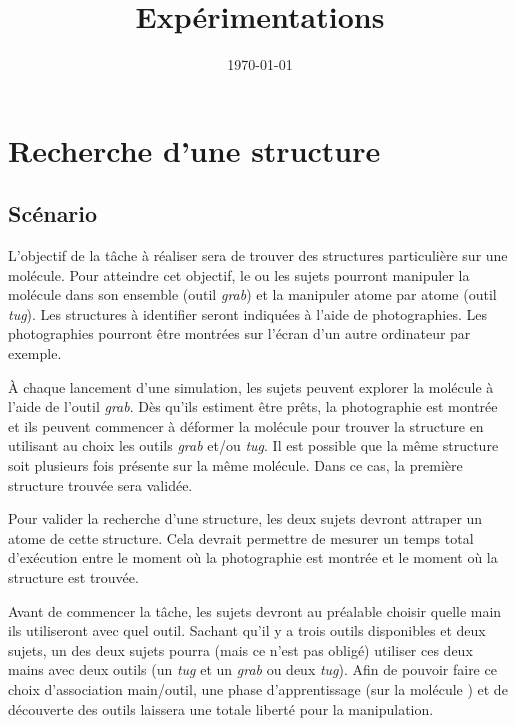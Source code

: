 \documentclass[a4paper,fleqn]{report}
\title{Expérimentations}
\author{}
\date{\today}
\begin{document}
	\maketitle
	\chapter{Recherche d'une structure}
		\section{Scénario}
			L'objectif de la tâche à réaliser sera de trouver des structures particulière sur une molécule.
			Pour atteindre cet objectif, le ou les sujets pourront manipuler la molécule dans son ensemble (outil \emph{grab}) et la manipuler atome par atome (outil \emph{tug}).
			Les structures à identifier seront indiquées à l'aide de photographies.
			Les photographies pourront être montrées sur l'écran d'un autre ordinateur par exemple.

			À chaque lancement d'une simulation, les sujets peuvent explorer la molécule à l'aide de l'outil \emph{grab}.
			Dès qu'ils estiment être prêts, la photographie est montrée et ils peuvent commencer à déformer la molécule pour trouver la structure en utilisant au choix les outils \emph{grab} et/ou \emph{tug}.
			Il est possible que la même structure soit plusieurs fois présente sur la même molécule.
			Dans ce cas, la première structure trouvée sera validée.

			Pour valider la recherche d'une structure, les deux sujets devront attraper un atome de cette structure.
			Cela devrait permettre de mesurer un temps total d'exécution entre le moment où la photographie est montrée et le moment où la structure est trouvée.

			Avant de commencer la tâche, les sujets devront au préalable choisir quelle main ils utiliseront avec quel outil.
			Sachant qu'il y a trois outils disponibles et deux sujets, un des deux sujets pourra (mais ce n'est pas obligé) utiliser ces deux mains avec deux outils (un \emph{tug} et un \emph{grab} ou deux \emph{tug}).
			Afin de pouvoir faire ce choix d'association main/outil, une phase d'apprentissage (sur la molécule ) et de découverte des outils laissera une totale liberté pour la manipulation.
\end{document}
